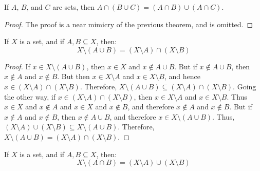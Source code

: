             \begin{theorem}
                If $A$, $B$, and $C$ are sets, then
                $A\cap(B\cup{C})=(A\cap{B})\cup(A\cap{C})$.
            \end{theorem}
            \begin{proof}
                The proof is a near mimicry of the previous theorem, and is
                omitted.
            \end{proof}
            \begin{theorem}
                If $X$ is a set, and if $A,B\subseteq{X}$, then:%
                \begin{equation}
                    X\setminus(A\cup{B})=
                    (X\setminus{A})\cap(X\setminus{B})
                \end{equation}
            \end{theorem}
            \begin{proof}
                If $x\in{X}\setminus(A\cup{B})$, then
                $x\in{X}$ and $x\notin{A}\cup{B}$. But if
                $x\notin{A}\cup{B}$, then $x\notin{A}$ and
                $x\notin{B}$. But then
                $x\in{X}\setminus{A}$ and $x\in{X}\setminus{B}$, and
                hence $x\in(X\setminus{A})\cap(X\setminus{B})$. Therefore,
                $X\setminus(A\cup{B})\subseteq(X\setminus{A})\cap(X\setminus{B})$.
                Going the other way, if
                $x\in(X\setminus{A})\cap(X\setminus{B})$, then
                $x\in{X}\setminus{A}$ and $x\in{X}\setminus{B}$. Thus
                $x\in{X}$ and $x\notin{A}$ and $x\in{X}$ and $x\notin{B}$, and
                therefore $x\notin{A}$ and $x\notin{B}$. But if $x\notin{A}$
                and $x\notin{B}$, then $x\notin{A}\cup{B}$, and therefore
                $x\in{X}\setminus(A\cup{B})$. Thus,
                $(X\setminus{A})\cup(X\setminus{B})\subseteq{X}\setminus(A\cup{B})$.
                Therefore,
                $X\setminus(A\cup{B})=(X\setminus{A})\cap(X\setminus{B})$.
            \end{proof}
            \begin{theorem}
                If $X$ is a set, and if $A,B\subseteq{X}$, then:%
                \begin{equation}
                    X\setminus(A\cap{B})=
                    (X\setminus{A})\cup(X\setminus{B})
                \end{equation}
            \end{theorem}
